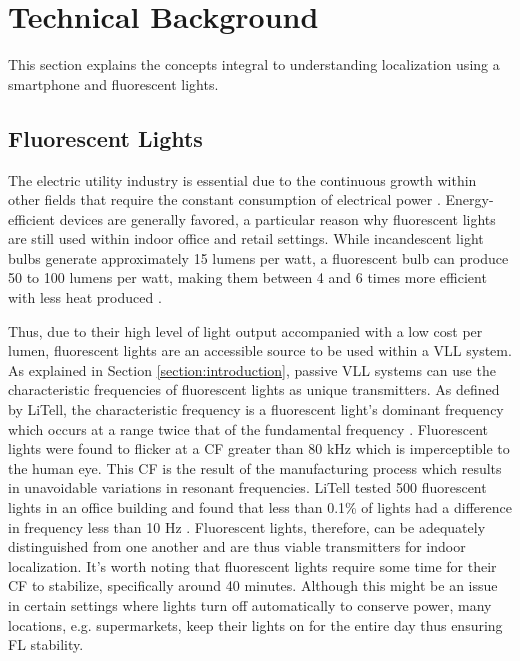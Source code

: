 \documentclass[conference]{IEEEtran}
\begin{document}
\section{Technical Background}\label{section:technicalbackground}

This section explains the concepts integral to understanding localization using a smartphone and fluorescent lights.

\subsection{Fluorescent Lights}

The electric utility industry is essential due to the continuous growth within other fields that require the constant consumption of electrical power \cite{sasaki1994impact}. Energy-efficient devices are generally favored, a particular reason why fluorescent lights are still used within indoor office and retail settings. While incandescent light bulbs generate approximately 15 lumens per watt, a fluorescent bulb can produce 50 to 100 lumens per watt, making them between 4 and 6 times more efficient with less heat produced \cite{lumensperwattcomparison}.

Thus, due to their high level of light output accompanied with a low cost per lumen, fluorescent lights are an accessible source to be used within a VLL system. As explained in Section \ref{section:introduction}, passive VLL systems can use the characteristic frequencies of fluorescent lights as unique transmitters. As defined by LiTell, the characteristic frequency is a fluorescent light's dominant frequency which occurs at a range twice that of the fundamental frequency \cite{zhang2016litell}. Fluorescent lights were found to flicker at a CF greater than 80 kHz which is imperceptible to the human eye. This CF is the result of the manufacturing process which results in unavoidable variations in resonant frequencies. LiTell tested 500 fluorescent lights in an office building and found that less than 0.1\% of lights had a difference in frequency less than 10 Hz \cite{zhang2016litell}. Fluorescent lights, therefore, can be adequately distinguished from one another and are thus viable transmitters for indoor localization. It's worth noting that fluorescent lights require some time for their CF to stabilize, specifically around 40 minutes. Although this might be an issue in certain settings where lights turn off automatically to conserve power, many locations, e.g. supermarkets, keep their lights on for the entire day thus ensuring FL stability.
\end{document}
